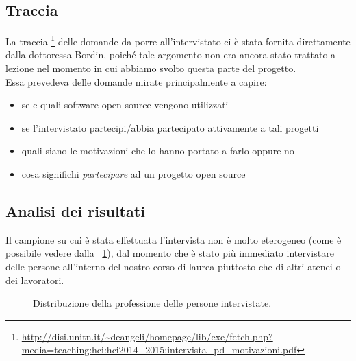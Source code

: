 \documentclass[12pt]{article} %
\begin{document}
\subsection{Traccia}
La traccia \footnote{\url{http://disi.unitn.it/~deangeli/homepage/lib/exe/fetch.php?media=teaching:hci:hci2014_2015:intervista_pd_motivazioni.pdf}} delle domande da porre all'intervistato ci è stata fornita direttamente dalla dottoressa Bordin, poiché tale argomento non era ancora stato trattato a lezione nel momento in cui abbiamo svolto questa parte del progetto.\\
Essa prevedeva delle domande mirate principalmente a capire:
\begin{itemize}
\item se e quali software open source vengono utilizzati
\item se l'intervistato partecipi/abbia partecipato attivamente a tali progetti
\item quali siano le motivazioni che lo hanno portato a farlo oppure no
\item cosa significhi \emph{partecipare} ad un progetto open source
\end{itemize}
\subsection{Analisi dei risultati}
Il campione su cui è stata effettuata l'intervista non è molto eterogeneo (come è possibile vedere dalla \ \ref{fig:distribuzione}), dal momento che è stato più immediato intervistare delle persone all'interno del nostro corso di laurea piuttosto che di altri atenei o dei lavoratori.

\begin{figure}[H] 
\caption{Distribuzione della professione delle persone intervistate.}
\label{fig:distribuzione}
\end{figure}
\end{document}
